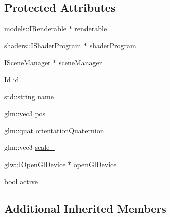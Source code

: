 \subsection*{Protected Attributes}
\begin{DoxyCompactItemize}
\item 
\hyperlink{classglr_1_1models_1_1IRenderable}{models\-::\-I\-Renderable} $\ast$ \hyperlink{classglr_1_1BasicSceneNode_a35e50a3683416e32f6de3dd85cfebeee}{renderable\-\_\-}
\item 
\hyperlink{classglr_1_1shaders_1_1IShaderProgram}{shaders\-::\-I\-Shader\-Program} $\ast$ \hyperlink{classglr_1_1BasicSceneNode_a5c51888436caf0096125b3f94d177bae}{shader\-Program\-\_\-}
\item 
\hyperlink{classglr_1_1ISceneManager}{I\-Scene\-Manager} $\ast$ \hyperlink{classglr_1_1BasicSceneNode_ac7e2e35880f8aac581fc01a8d96be89d}{scene\-Manager\-\_\-}
\item 
\hyperlink{classglr_1_1Id}{Id} \hyperlink{classglr_1_1BasicSceneNode_a9f431cf1fd91fb8d2873d7afdffa7b0e}{id\-\_\-}
\item 
std\-::string \hyperlink{classglr_1_1BasicSceneNode_a69b060fc10ea5e9899ab3b8dd5d2ec42}{name\-\_\-}
\item 
glm\-::vec3 \hyperlink{classglr_1_1BasicSceneNode_abedd8fd8a3adb3a761444f3d7314f8b8}{pos\-\_\-}
\item 
glm\-::quat \hyperlink{classglr_1_1BasicSceneNode_a109ae99b7ab0d0fbb6a9498794c1a8f5}{orientation\-Quaternion\-\_\-}
\item 
glm\-::vec3 \hyperlink{classglr_1_1BasicSceneNode_a307a3cb15c861120c010af11da38b785}{scale\-\_\-}
\item 
\hyperlink{classglr_1_1glw_1_1IOpenGlDevice}{glw\-::\-I\-Open\-Gl\-Device} $\ast$ \hyperlink{classglr_1_1BasicSceneNode_afc77302b4f85ed240d990c9261812a94}{open\-Gl\-Device\-\_\-}
\item 
bool \hyperlink{classglr_1_1BasicSceneNode_a8a770ee05b35396d7390c14fc0216793}{active\-\_\-}
\end{DoxyCompactItemize}
\subsection*{Additional Inherited Members}


